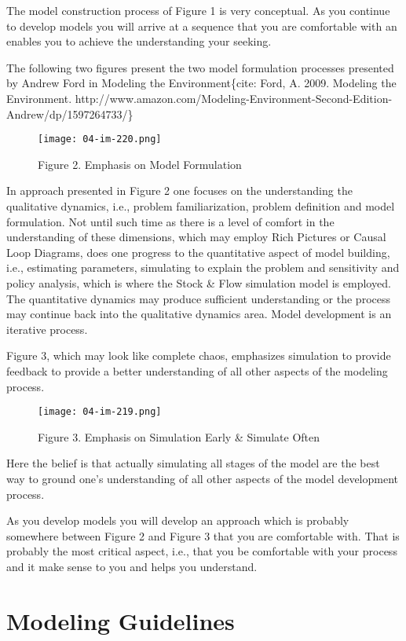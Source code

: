 \documentclass[]{memoir}
\makeatletter
\def\maxwidth{\ifdim\Gin@nat@width>\linewidth\linewidth
\else\Gin@nat@width\fi}
\let\Oldincludegraphics\includegraphics
\renewcommand{\includegraphics}[1]{\Oldincludegraphics[width=\maxwidth]{#1}}
\makeatother
\begin{document}
The model construction process of Figure 1 is very conceptual. As you
continue to develop models you will arrive at a sequence that you are
comfortable with an enables you to achieve the understanding your
seeking.

The following two figures present the two model formulation processes
presented by Andrew Ford in Modeling the Environment\{cite: Ford, A.
2009. Modeling the Environment.
http://www.amazon.com/Modeling-Environment-Second-Edition-Andrew/dp/1597264733/\}

\begin{figure}[htbp]
\centering
\texttt{[image: 04-im-220.png]}
\caption{Figure 2. Emphasis on Model Formulation}
\end{figure}

In approach presented in Figure 2 one focuses on the understanding the
qualitative dynamics, i.e., problem familiarization, problem definition
and model formulation. Not until such time as there is a level of
comfort in the understanding of these dimensions, which may employ Rich
Pictures or Causal Loop Diagrams, does one progress to the quantitative
aspect of model building, i.e., estimating parameters, simulating to
explain the problem and sensitivity and policy analysis, which is where
the Stock \& Flow simulation model is employed. The quantitative
dynamics may produce sufficient understanding or the process may
continue back into the qualitative dynamics area. Model development is
an iterative process.

Figure 3, which may look like complete chaos, emphasizes simulation to
provide feedback to provide a better understanding of all other aspects
of the modeling process.

\begin{figure}[htbp]
\centering
\texttt{[image: 04-im-219.png]}
\caption{Figure 3. Emphasis on Simulation Early \& Simulate Often}
\end{figure}

Here the belief is that actually simulating all stages of the model are
the best way to ground one's understanding of all other aspects of the
model development process.

As you develop models you will develop an approach which is probably
somewhere between Figure 2 and Figure 3 that you are comfortable with.
That is probably the most critical aspect, i.e., that you be comfortable
with your process and it make sense to you and helps you understand.

\section{Modeling Guidelines}
\end{document}
